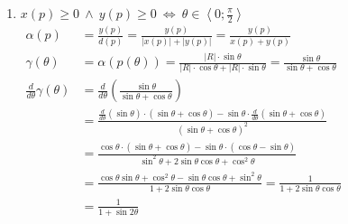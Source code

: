\begin{enumerate}
	\oneDirectory
  			\item $x\left(p\right) \geqslant 0 \ \wedge \  y\left(p\right) \geqslant 0 \ \Leftrightarrow \ \theta \in \left\langle 0;\frac{\pi}{2}\right\rangle$
  		\begin{align*}
        	\alpha\left( p\right) & = \frac{
        		y\left(p\right)
        	}{
        		d\left(p\right)
        	} = \frac{
        		y\left(p\right)
        	}{
        		\left|x\left(p\right)\right| + \left|y\left(p\right)\right|
        	} = \frac{
        		y\left(p\right)
        	}{
        		x\left(p\right) + y\left(p\right)
        	} & \hspace{10cm}\\
        	\gamma\left( \theta\right) & = \alpha\left( p\left(\theta\right) \right) = \frac{
        		\left|R\right| \cdot \sin \theta
        	}{
        		\left|R\right| \cdot \cos \theta + \left|R\right| \cdot \sin \theta
        	} =\frac{
        		\sin \theta
        	}{
        		\sin \theta + \cos \theta
        	} \\
        	\frac{
        		d
        	}{
        		d\theta
        	}\gamma\left( \theta\right) & = \frac{
        		d
        	}{
        		d\theta
        	}\left(
        		\frac{ 
        			\sin \theta
        		}{
        			\sin \theta + \cos \theta
        		}
        	\right) \\ 
        	& =\frac{
        		\frac{
        			d
        		}{
        			d\theta
        		}\left(
        			\sin\theta
        		\right)\cdot\left(
        			\sin \theta + \cos \theta
        		\right)
        		-\sin\theta\cdot\frac{
        			d
        		}{
        			d\theta
        		}\left(\sin \theta + \cos \theta\right)
        	}{
        		\left(
        			\sin \theta + \cos \theta
        		\right)^2
        	}\\
        	& =\frac{
        		\cos\theta\cdot\left(\sin \theta + \cos \theta\right)
        		-\sin\theta\cdot\left(\cos \theta - \sin \theta\right)
        	}{
        		\sin^2 \theta + 2\sin\theta\cos\theta + \cos^2 \theta 
        	}\\
        	& =\frac{
        		\cos\theta\sin \theta + \cos^2 \theta
        		-\sin\theta\cos \theta  + \sin^2 \theta
        	}{
        		1 + 2\sin\theta\cos\theta
        	} = \frac{
        		1
        	}{
        		1 + 2\sin\theta\cos\theta
        	} \\
        	& = \frac{
        		1
        	}{
        		1 + \sin 2\theta
}
\end{align*}
\end{enumerate}

